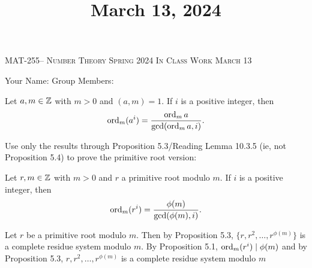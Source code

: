 \documentclass[handout]{ximera}
\title{March 13, 2024}
\begin{document}
\handoutAbstract
\maketitle
    \begin{center}%
        {\large \scshape MAT-255-- Number Theory \hfill Spring 2024 \hfill In Class Work March 13}%
        
        {\large
            Your Name: \hrulefill \quad Group Members:\hrulefill \quad \hrulefill
        \par}%
    \end{center}%
 
\begin{prop*}[Proposition 5.4]\label{prop:compare-order}
    Let $a,m\in\mathbb Z$ with $m>0$ and $(a,m)=1.$ If $i$ is a positive integer, then 
    \[\operatorname{ord}_m(a^i)=\frac{\operatorname{ord}_m a}{\gcd(\operatorname{ord}_m a,i)}.\]
\end{prop*}

\begin{br}
    Use only the results through Proposition 5.3/Reading Lemma 10.3.5 (ie, not Proposition 5.4) to prove the primitive root version:


    \begin{prop*}
        Let $r,m\in\mathbb Z$ with $m>0$ and $r$ a primitive root modulo $m.$
        If $i$ is a positive integer, then 
    \[\operatorname{ord}_m(r^i)=\frac{\phi(m)}{\gcd(\phi(m),i)}.\]
    \end{prop*}
    \begin{solution}
        Let $r$ be a primitive root modulo $m.$ Then by Proposition 5.3, $\{r,r^2,\dots,r^{\phi(m)}\}$ is a complete residue system modulo $m.$
        By Proposition 5.1, $\operatorname{ord}_m(r^i)\mid \phi(m)$ and by Proposition 5.3, $r,r^2,\dots,r^{\phi(m)}$ is a complete residue system modulo $m$ 
    \end{solution}
    \pdfOnly{\ifhandout
        \vfill
        \else\fi}
\end{br}
\end{document}
